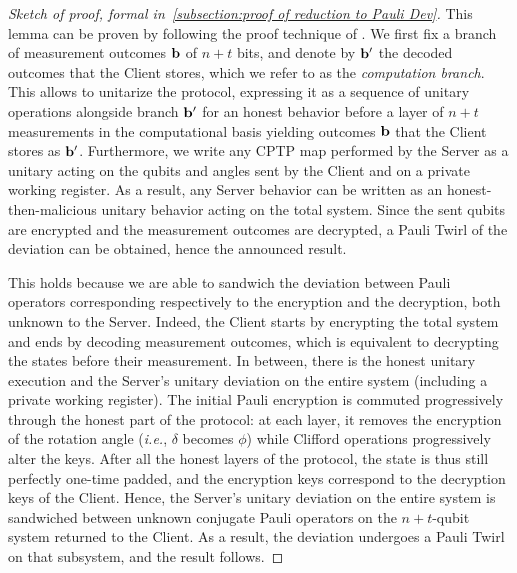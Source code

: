 \begin{proof}[Sketch of proof, formal in~\ref{subsection:proof of reduction to Pauli Dev}]
    This lemma can be proven by following the proof technique of \cite{FK17unconditionally,KKLM22unifying}. We first fix a branch of measurement outcomes $\mathbf b$ of $n+t$ bits, and denote by $\mathbf b'$ the decoded outcomes that the Client stores, which we refer to as the \emph{computation branch}.
    This allows to unitarize the protocol, expressing it as a sequence of unitary operations alongside branch $\mathbf b'$ for an honest behavior before a layer of $n+t$ measurements in the computational basis yielding outcomes $\mathbf b$ that the Client stores as $\mathbf b'$.
    Furthermore, we write any CPTP map performed by the Server as a unitary acting on the qubits and angles sent by the Client and on a private working register. As a result, any Server behavior can be written as an honest-then-malicious unitary behavior acting on the total system.
    Since the sent qubits are encrypted and the measurement outcomes are decrypted, a Pauli Twirl of the deviation can be obtained, hence the announced result.

    This holds because we are able to sandwich the deviation between Pauli operators corresponding respectively to the encryption and the decryption, both unknown to the Server. Indeed, the Client starts by encrypting the total system and ends by decoding measurement outcomes, which is equivalent to decrypting the states before their measurement. In between, there is the honest unitary execution and the Server's unitary deviation on the entire system (including a private working register). The initial Pauli encryption is commuted progressively through the honest part of the protocol: at each layer, it removes the encryption of the rotation angle (\emph{i.e.}, $\delta$ becomes $\phi$) while Clifford operations progressively alter the keys. After all the honest layers of the protocol, the state is thus still perfectly one-time padded, and the encryption keys correspond to the decryption keys of the Client. Hence, the Server's unitary deviation on the entire system is sandwiched between unknown conjugate Pauli operators on the $n+t$-qubit system returned to the Client. As a result, the deviation undergoes a Pauli Twirl on that subsystem, and the result follows.
\end{proof}

